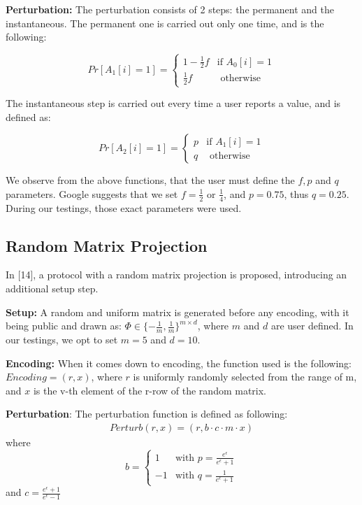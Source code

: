 \textbf{Perturbation:} The perturbation consists of 2 steps: the permanent and the instantaneous. The permanent one is carried out only one time, and is the following: 

\begin{equation*}
    Pr[A_1[i] = 1] =
	\begin{cases}
		1 - \frac{1}{2}f & \mbox{if } A_0[i]=1 \\
		\frac{1}{2}f & \mbox{ otherwise}
			\end{cases}
\end{equation*}

The instantaneous step is carried out every time a user reports a value, and is defined as:

\begin{equation*}
    Pr[A_2[i] = 1] =
	\begin{cases}
		p & \mbox{if } A_1[i]=1 \\
		q & \mbox{ otherwise}
			\end{cases}
\end{equation*}

We observe from the above functions, that the user must define the $f, p $ and $q$ parameters. Google suggests that we set $f = \frac{1}{2}$ or $\frac{1}{4}$, and $p = 0.75$, thus $q = 0.25$. During our testings, those exact parameters were used. 


\subsection{Random Matrix Projection}
In [14], a protocol with a random matrix projection is proposed, introducing an additional setup step.

\textbf{Setup:} A random and uniform matrix is generated before any encoding, with it being public and drawn as: $\Phi \in \{-\frac{1}{m}, \frac{1}{m}\}^{m \times d}$, where $m$ and $d$ are user defined. In our testings, we opt to set $m = 5$ and $d = 10$.

\textbf{Encoding:} When it comes down to encoding, the function used is the following: $Encoding = (r,x)$, where $r$ is uniformly randomly selected from the range of m, and $x$ is the v-th element of the r-row of the random matrix.

\textbf{Perturbation}: The perturbation function is defined as following: 
\begin{align*}
 Perturb(r,x) = (r, b\cdot c \cdot m \cdot x) 
\end{align*}
 where
\begin{equation*}
    b =
	\begin{cases}
		1 & \mbox{with } p = \frac{e^\epsilon}{e^\epsilon + 1} \\
		-1 & \mbox{with } q = \frac{1}{e^\epsilon + 1}			
	\end{cases}
\end{equation*}
and $c = \frac{e^\epsilon +1}{e^\epsilon -1}$

